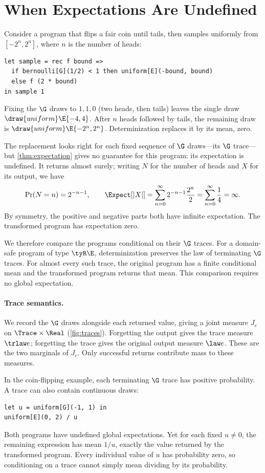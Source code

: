 \clearpage
\section{When Expectations Are Undefined}
\label{sec:traces}

Consider a program that flips a fair coin until tails, then samples uniformly
from $[-2^n,2^n]$, where $n$ is the number of heads:
\begin{lstlisting}
let sample = rec f bound =>
  if bernoulli[G](1/2) < 1 then uniform[E](-bound, bound)
  else f (2 * bound)
in sample 1
\end{lstlisting}
Fixing the $\G$ draws to $1,1,0$ (two heads, then tails) leaves the single draw
$\draw{uniform}\E{-4,4}$. After $n$ heads followed by tails, the
remaining draw is $\draw{uniform}\E{-2^n,2^n}$. Determinization replaces it
by its mean, zero.

The replacement looks right for each fixed sequence of $\G$ draws---its
$\G$ trace---but \cref{thm:expectation} gives no guarantee for this program:
its expectation is undefined. It returns almost surely; writing $N$ for the number of heads
and $X$ for its output, we have
\[
 \Pr(N=n)=2^{-n-1},\qquad
 \Expect[|X|]=\sum_{n=0}^{\infty}2^{-n-1}\frac{2^n}{2}
 =\sum_{n=0}^{\infty}\frac14=\infty.
\]
By symmetry, the positive and negative parts both have infinite expectation.
The transformed program has expectation zero.

We therefore compare the programs conditional on their $\G$ traces. For a
domain-safe program of type $\tyR\E$, determinization preserves the law of terminating $\G$ traces. For almost every such trace, the original program has a finite
conditional mean and the transformed program returns that mean. This comparison requires no
global expectation.

\paragraph{Trace semantics.}
We record the $\G$ draws alongside each returned value, giving a joint measure
$J_e$ on $\Trace\times\Real$ (\cref{fig:traces}). Forgetting the output gives
the trace measure $\trlaw e$; forgetting the trace gives the original output
measure $\law e$. These are the two marginals of $J_e$.
Only successful returns contribute mass to these measures.



\noindent\begin{minipage}{\linewidth}
In the coin-flipping example, each terminating $\G$ trace has positive probability.
A trace can also contain continuous draws:
\begin{lstlisting}
let u = uniform[G](-1, 1) in
uniform[E](0, 2) / u
\end{lstlisting}
Both programs have undefined global expectations. Yet for each fixed $u\ne0$,
the remaining expression has mean $1/u$, exactly the value returned by the
transformed program. Every individual value of $u$ has probability zero, so conditioning on a trace
cannot simply mean dividing by its probability.
\end{minipage}

